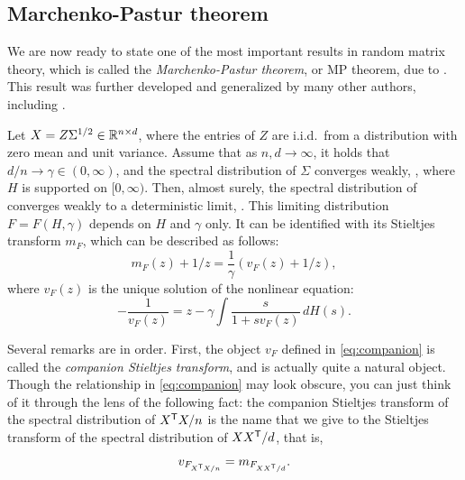 \documentclass{article}
\begin{document}
\subsection{Marchenko-Pastur theorem}

We are now ready to state one of the most important results in random matrix
theory, which is called the \emph{Marchenko-Pastur theorem}, or MP theorem, due
to \citet{marchenko1967distribution}. This result was further developed and
generalized by many other authors, including \citet{silverstein1995strong}.   

\begin{theorem}
\label{thm:mp}
Let $X = Z \Sigma^{1/2} \in \mathbb{R}^{n \times d}$, where the entries of $Z$ are
i.i.d.\ from a distribution with zero mean and unit variance. Assume that as
$n,d \to \infty$, it holds that $d/n \to \gamma \in (0,\infty)$, and the
spectral distribution of $\Sigma$ converges weakly, ,
where $H$ is supported on $[0,\infty)$. Then, almost surely, the spectral
distribution of  converges weakly to a deterministic
limit, . This limiting distribution $F = F(H,
\gamma)$ depends on $H$ and $\gamma$ only. It can be identified with its
Stieltjes transform $m_F$, which can be described as follows:
\begin{equation}
\label{eq:companion}
m_F(z) + 1/z = \frac{1}{\gamma}(v_F(z) + 1/z),
\end{equation} 
where $v_F(z)$ is the unique solution of the nonlinear equation:
\begin{equation}
\label{eq:silverstein}
-\frac{1}{v_F(z)} = z - \gamma \int \frac{s}{1 + sv_F(z)} \, dH(s).
\end{equation}
\end{theorem}

Several remarks are in order. First, the object $v_F$ defined in
\eqref{eq:companion} is called the \emph{companion Stieltjes transform}, and is
actually quite a natural object. Though the relationship in \eqref{eq:companion}
may look obscure, you can just think of it through the lens of the following
fact: the companion Stieltjes transform of the spectral distribution of $X^{\mathsf{T}} 
X/n$ is the name that we give to the Stieltjes transform of the spectral
distribution of $XX^{\mathsf{T}}/d$, that is,  
\[
v_{F_{X^{\mathsf{T}} X/n}} = m_{F_{XX^{\mathsf{T}}/d}}.
\]
\end{document}
